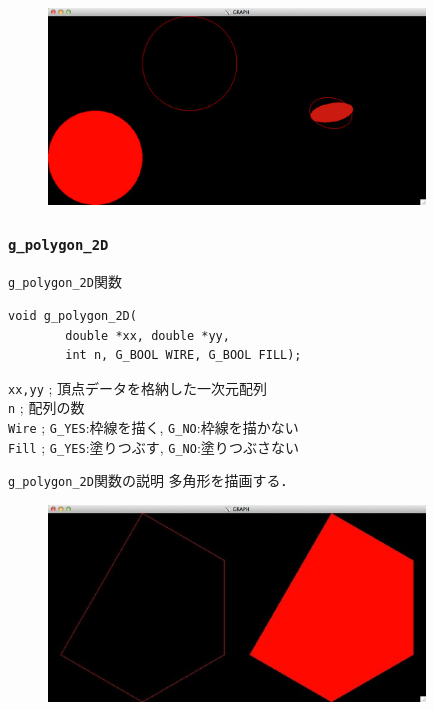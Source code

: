 \documentclass[platex,a4paper,12pt]{jsarticle}%
\begin{document}
\begin{figure}[htb]
	\includegraphics[width=100mm]{./Figures/eps/Canvas_g_circle2.eps}
\end{figure}




\clearpage
\subsubsection{\texttt{g\_polygon\_2D}}

\begin{itembox}[l]{\texttt{g\_polygon\_2D}関数}
\begin{verbatim}
void g_polygon_2D(
        double *xx, double *yy,
        int n, G_BOOL WIRE, G_BOOL FILL);
\end{verbatim}
\verb|xx,yy| ; 頂点データを格納した一次元配列\\
\verb|n| ; 配列の数\\
\verb|Wire| ; \verb|G_YES|:枠線を描く, \verb|G_NO|:枠線を描かない \\
\verb|Fill| ; \verb|G_YES|:塗りつぶす, \verb|G_NO|:塗りつぶさない 
\end{itembox}

\begin{itembox}[l]{\texttt{g\_polygon\_2D}関数の説明}
多角形を描画する．
\end{itembox}

\begin{figure}[htb]
	\includegraphics[width=100mm]{./Figures/eps/Canvas_g_polygon.eps}
\end{figure}
\end{document}
